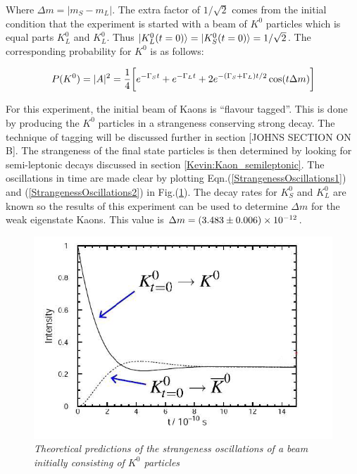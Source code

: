 \noindent Where $\Delta m = |m_{S} - m_{L}|$. The extra factor of $1/{\sqrt{2}}$ comes from the initial condition that the experiment is started with a beam of $K^{0}$ particles which is equal parts $K^{0}_{L}$ and $K^{0}_{L}$. Thus $\ket{K^{0}_{L}(t=0)} = \ket{K^{0}_{S}(t=0)} = 1/{\sqrt{2}}$. The corresponding probability for $K^{0}$ is as follows:

\begin{equation}\label{StrangenessOscillations2}
P({K}^{0}) = |{A}|^{2} = \frac{1}{4} \bigg[ e^{-\Gamma_{S}t} + e^{-\Gamma_{L}t} + 2 e^{-(\Gamma_{S} + \Gamma_{L})t/2} \cos(t \Delta m )\bigg] \\
\end{equation}

For this experiment, the initial beam of Kaons is ``flavour tagged''. This is done by producing the $K^{0}$ particles in a strangeness conserving strong decay. The technique of tagging will be discussed further in section [JOHNS SECTION ON B]. The strangeness of the final state particles is then determined by looking for semi-leptonic decays discussed in section \ref{Kevin:Kaon_semileptonic}. The oscillations in time are made clear by plotting Eqn.(\ref{StrangenessOscillations1}) and (\ref{StrangenessOscillations2}) in Fig.(\ref{StrangenessOscillationsPic}). The decay rates for $K^{0}_{S}$ and $K^{0}_{L}$ are known so the results of this experiment can be used to determine $\Delta m$ for the weak eigenstate Kaons. This value is $\Delta m = (3.483 \pm 0.006) \times 10^{-12}$.       

\begin{figure}[h!]
\begin{center}
\includegraphics[scale=0.4]{figs/Strangeness_oscillations.png}
\end{center}
\caption{\textit{Theoretical predictions of the strangeness oscillations of a beam initially consisting of $K^{0}$ particles \cite{StrangenessPic}}}
\label{StrangenessOscillationsPic}
\end{figure}

